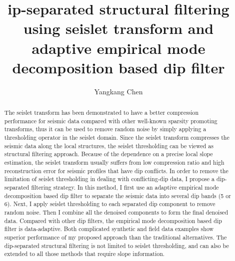 \title{ip-separated structural filtering using seislet transform and adaptive empirical mode decomposition based dip filter}

\renewcommand{\thefootnote}{\fnsymbol{footnote}}
\author{Yangkang Chen}

\address{
\footnotemark[1]Bureau of Economic Geology \\
John A. and Katherine G. Jackson School of Geosciences \\
The University of Texas at Austin \\
University Station, Box X \\
Austin, TX 78713-8924 \\
ykchen@utexas.edu
}

\maketitle

\DeclareRobustCommand{\dlo}[1]{\ifthenelse{\boolean{@revd}}{}{}}
\DeclareRobustCommand{\wen}[1]{%
  \ifthenelse{\boolean{@revd}}{\textcolor{black}{#1}}{#1}}
  
\begin{abstract}
The seislet transform has been demonstrated to have a better compression performance for seismic data compared with other well-known sparsity promoting transforms, thus it can be used to remove random noise by simply applying a thresholding operator in the seislet domain. Since the seislet transform compresses the seismic data along the local structures, the seislet thresholding can be viewed as \dlo{the simplest}\wen{a simple} structural filtering approach. Because of the dependence on a precise local slope estimation, the seislet transform usually suffers from low compression ratio and high reconstruction error for seismic profiles that have dip conflicts. In order to remove the limitation of seislet thresholding in dealing with conflicting-dip data, I propose a \dlo{semi-automatic} dip-separated filtering strategy. In this method, I first use an adaptive empirical mode decomposition based dip filter to separate the seismic data into several dip bands (5 or 6). Next, I apply seislet thresholding to each separated dip component to remove random noise. Then I combine all the denoised components to form the final denoised data. Compared with other dip filters, the empirical mode decomposition based dip filter is data-adaptive. Both complicated synthetic and field data examples show superior performance of my proposed approach than the traditional alternatives. The dip-separated structural filtering is not limited to seislet thresholding, and can also be extended to all those methods that require slope information.
\end{abstract}

